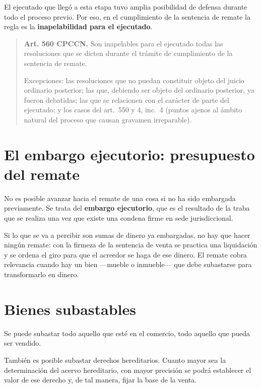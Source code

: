 \documentclass[12pt,oneside]{book}
\begin{document}
El ejecutado que llegó a esta etapa tuvo amplia posibilidad de defensa durante todo el proceso previo. Por eso, en el cumplimiento de la sentencia de remate la regla es la \textbf{inapelabilidad para el ejecutado}.

\begin{quote}
\textbf{Art. 560 CPCCN.} Son inapelables para el ejecutado todas las resoluciones que se dicten durante el trámite de cumplimiento de la sentencia de remate.

Excepciones: las resoluciones que no puedan constituir objeto del juicio ordinario posterior; las que, debiendo ser objeto del ordinario posterior, ya fueron debatidas; las que se relacionen con el carácter de parte del ejecutado; y los casos del art.~550 y 4, inc.~4 (puntos ajenos al ámbito natural del proceso que causan gravamen irreparable).
\end{quote}

\section{El embargo ejecutorio: presupuesto del remate}

No es posible avanzar hacia el remate de una cosa si no ha sido embargada previamente. Se trata del \textbf{embargo ejecutorio}, que es el resultado de la traba que se realiza una vez que existe una condena firme en sede jurisdiccional.

Si lo que se va a percibir son sumas de dinero ya embargadas, no hay que hacer ningún remate: con la firmeza de la sentencia de venta se practica una liquidación y se ordena el giro para que el acreedor se haga de ese dinero. El remate cobra relevancia cuando hay un bien ---mueble o inmueble--- que debe subastarse para transformarlo en dinero.

\section{Bienes subastables}

Se puede subastar todo aquello que esté en el comercio, todo aquello que pueda ser vendido.

También es posible subastar derechos hereditarios. Cuanto mayor sea la determinación del acervo hereditario, con mayor precisión se podrá establecer el valor de ese derecho y, de tal manera, fijar la base de la venta.
\end{document}
